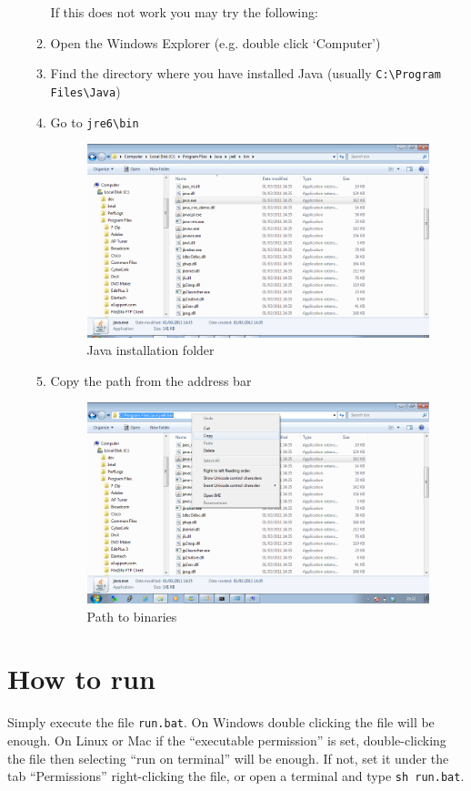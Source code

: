 \begin{enumerate}
\begin{enumerate}
		If this does not work you may try the following:
		
		\item Open the Windows Explorer (e.g. double click `Computer')
		\item Find the directory where you have installed Java (usually \verb!C:\Program Files\Java!)
		\item Go to \verb!jre6\bin!
		\begin{figure}[H]\label{fig:jre}
		\centering
		\includegraphics[width=1.0\textwidth]{img/step-by-step-win/0-1-localize-java}
		\caption{Java installation folder}
		\end{figure}
		\item Copy the path from the address bar
		\begin{figure}[H]\label{fig:address}
		\centering
		\includegraphics[width=1.0\textwidth]{img/step-by-step-win/0-2-copy-path}
		\caption{Path to binaries}
		\end{figure}
	\end{enumerate}
	
\end{enumerate}


\section{How to run}\label{run}

Simply execute the file {\tt run.bat}.
On Windows double clicking the file will be enough.
On Linux or Mac if the ``executable permission'' is set, double-clicking the file then selecting ``run on terminal'' will be enough. If not, set it under the tab ``Permissions'' right-clicking the file, or open a terminal and type {\tt sh run.bat}.